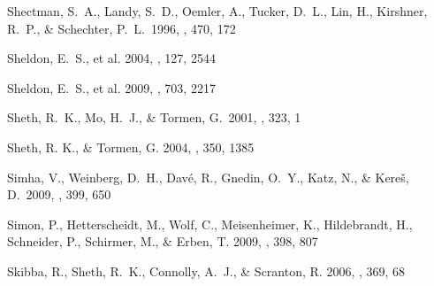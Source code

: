 \documentclass[]{emulateapj}
\begin{document}
\begin{thebibliography}{999}

Shectman, S.~A., Landy, S.~D., Oemler, A., Tucker, D.~L., Lin, H.,
Kirshner, R.~P., \& Schechter, P.~L.\ 1996, \apj, 470, 172


Sheldon, E.\ S., et al. 2004, \aj, 127, 2544

Sheldon, E.\ S., et al. 2009, 
\apj, 703, 2217 



Sheth, R.\ K., Mo, H.\ J., \& Tormen, G.\ 2001, \mnras, 323, 1


Sheth, R. K., \& Tormen, G. 2004, \mnras, 350, 1385

Simha, V., Weinberg, D.~H., Dav{\'e}, R., Gnedin, O.~Y., Katz, N., 
\& Kere{\v s}, D.\ 2009, \mnras, 399, 650 

Simon, P., Hetterscheidt, M., Wolf, C., Meisenheimer, K., Hildebrandt, H., 
Schneider, P., Schirmer, M., \& Erben, T. 2009, \mnras, 398, 807

Skibba, R., Sheth, R.~K., Connolly, A.~J., 
\& Scranton, R. 2006, \mnras, 369, 68 


\end{thebibliography}
\end{document}
